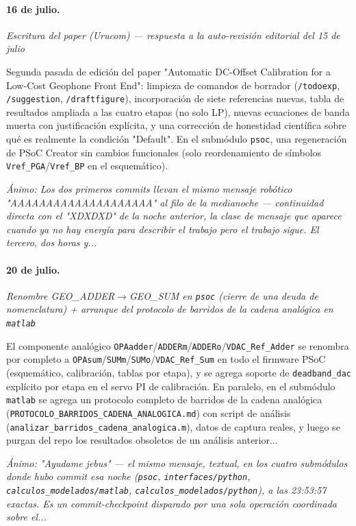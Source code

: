 \paragraph{16 de julio.}
\emph{Escritura del paper (Urucom) --- respuesta a la auto-revisión editorial del 15 de julio}

Segunda pasada de edición del paper "Automatic DC-Offset Calibration for a Low-Cost Geophone Front End": limpieza de comandos de borrador (\texttt{/todoexp}, \texttt{/suggestion}, \texttt{/draftfigure}), incorporación de siete referencias nuevas, tabla de resultados ampliada a las cuatro etapas (no solo LP), nuevas ecuaciones de banda muerta con justificación explícita, y una corrección de honestidad científica sobre qué es realmente la condición "Default". En el submódulo \texttt{psoc}, una regeneración de PSoC Creator sin cambios funcionales (solo reordenamiento de símbolos \texttt{Vref\_PGA}/\texttt{Vref\_BP} en el esquemático).

{\footnotesize\itshape \'Animo: Los dos primeros commits llevan el mismo mensaje robótico "AAAAAAAAAAAAAAAAAAAA" al filo de la medianoche --- continuidad directa con el "XDXDXD" de la noche anterior, la clase de mensaje que aparece cuando ya no hay energía para describir el trabajo pero el trabajo sigue. El tercero, dos horas y...}

\paragraph{20 de julio.}
\emph{Renombre GEO\_ADDER$\rightarrow$GEO\_SUM en \texttt{psoc} (cierre de una deuda de nomenclatura) + arranque del protocolo de barridos de la cadena analógica en \texttt{matlab}}

El componente analógico \texttt{OPAadder}/\texttt{ADDERm}/\texttt{ADDERo}/\texttt{VDAC\_Ref\_Adder} se renombra por completo a \texttt{OPAsum}/\texttt{SUMm}/\texttt{SUMo}/\texttt{VDAC\_Ref\_Sum} en todo el firmware PSoC (esquemático, calibración, tablas por etapa), y se agrega soporte de \texttt{deadband\_dac} explícito por etapa en el servo PI de calibración. En paralelo, en el submódulo \texttt{matlab} se agrega un protocolo completo de barridos de la cadena analógica (\texttt{PROTOCOLO\_BARRIDOS\_CADENA\_ANALOGICA.md}) con script de análisis (\texttt{analizar\_barridos\_cadena\_analogica.m}), datos de captura reales, y luego se purgan del repo los resultados obsoletos de un análisis anterior...

{\footnotesize\itshape \'Animo: "Ayudame jebus" --- el mismo mensaje, textual, en los cuatro submódulos donde hubo commit esa noche (\texttt{psoc}, \texttt{interfaces/python}, \texttt{calculos\_modelados/matlab}, \texttt{calculos\_modelados/python}), a las 23:53:57 exactas. Es un commit-checkpoint disparado por una sola operación coordinada sobre el...}

